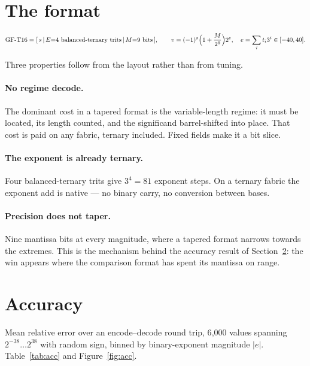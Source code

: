 \documentclass[11pt]{article}
\begin{document}
\section{The format}\label{sec:format}

\begin{equation}
\text{GF-T16}=[\,s\,|\,E{=}4\ \text{balanced-ternary trits}\,|\,M{=}9\ \text{bits}\,],
\qquad
v=(-1)^{s}\Bigl(1+\frac{M}{2^{9}}\Bigr)2^{e},
\quad e=\sum_{i} t_i 3^i \in [-40,40].
\end{equation}

Three properties follow from the layout rather than from tuning.

\paragraph{No regime decode.} The dominant cost in a tapered format is the
variable-length regime: it must be located, its length counted, and the
significand barrel-shifted into place. That cost is paid on any fabric, ternary
included. Fixed fields make it a bit slice.

\paragraph{The exponent is already ternary.} Four balanced-ternary trits give
$3^4=81$ exponent steps. On a ternary fabric the exponent add is native --- no
binary carry, no conversion between bases.

\paragraph{Precision does not taper.} Nine mantissa bits at every magnitude,
where a tapered format narrows towards the extremes. This is the mechanism behind
the accuracy result of Section~\ref{sec:accuracy}: the win appears where the
comparison format has spent its mantissa on range.

\section{Accuracy}\label{sec:accuracy}

Mean relative error over an encode--decode round trip, 6{,}000 values spanning
$2^{-38}\ldots2^{38}$ with random sign, binned by binary-exponent magnitude
$|e|$. Table~\ref{tab:acc} and Figure~\ref{fig:acc}.
\end{document}
